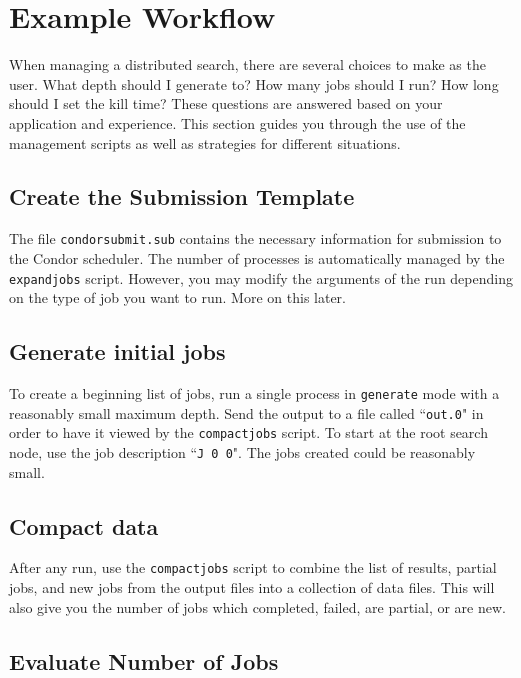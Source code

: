 \documentclass[11pt]{article}
\begin{document}
\section{Example Workflow}
\label{sec:workflow}

When managing a distributed search,
	there are several choices to make as the user.
What depth should I generate to?
How many jobs should I run?
How long should I set the kill time?
These questions are answered based on your application and
	experience.
This section guides you through the use of the management scripts
	as well as strategies for different situations.
	
\subsection{Create the Submission Template}

The file \texttt{condorsubmit.sub} contains the necessary information
	for submission to the Condor scheduler.
The number of processes is automatically managed by the \texttt{expandjobs} script.
However, you may modify the arguments of the run depending on the type of job 
	you want to run.
More on this later.

\subsection{Generate initial jobs}

To create a beginning list of jobs, 
	run a single process in \texttt{generate} mode
	with a reasonably small maximum depth.
Send the output to a file called ``\texttt{out.0}" in order
	to have it viewed by the \texttt{compactjobs} script.
To start at the root search node, use the job description ``\texttt{J 0 0}".
The jobs created could be reasonably small.

\subsection{Compact data}

After any run, use the \texttt{compactjobs} script to
	combine the list of results, partial jobs, and new jobs
	from the output files into a collection of data files.
This will also give you the number of jobs which completed, failed,
	are partial,
	or are new.

\subsection{Evaluate Number of Jobs}
\end{document}
